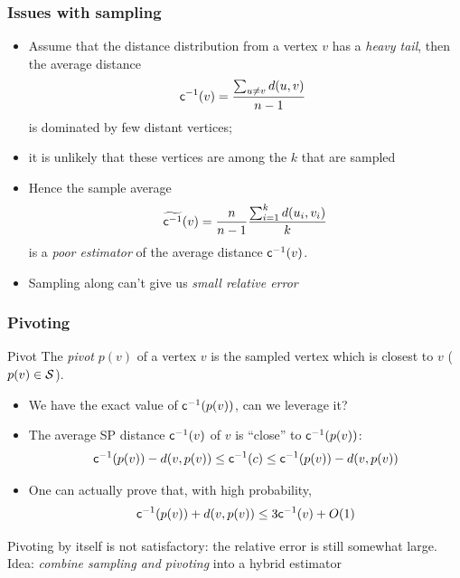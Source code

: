 \begin{frame}
  \frametitle{Issues with sampling}
  \begin{itemize}
    \item Assume that the distance distribution from a vertex $v$ has a
      \emph{heavy tail}, then the average distance
      \[
        \mathsf{c}^{-1}(v)=\frac{\sum_{u\neq v}d(u,v)}{n-1}\enspace
      \]
      is dominated by few distant vertices;
    \pause
    \item it is unlikely that these vertices are among the $k$ that are sampled
    \item Hence the sample average
      \[
        \widetilde{\mathsf{c}^{-1}}(v)=\frac{n}{n-1}\frac{\sum_{i=1}^k
        d(u_i,v_i)}{k}
      \]
      is a \emph{poor estimator} of the average distance $\mathsf{c}^{-1}(v)$.
    \pause
    \item Sampling along can't give us \emph{small relative error}
  \end{itemize}
\end{frame}

\begin{frame}
  \frametitle{Pivoting}
  \begin{definition}{Pivot}
    The \emph{pivot} $p(v)$ of a vertex $v$ is the sampled vertex which is
    closest to $v$ ($p(v)\in{\cal S}$).
  \end{definition}
  \begin{itemize}
    \item We have the exact value of $\mathsf{c}^{-1}(p(v))$, can we leverage
      it?
    \pause
    \item The average SP distance $\mathsf{c}^{-1}(v)$ of $v$ is ``close'' to
      $\mathsf{c}^{-1}(p(v))$:
      \[
        \mathsf{c}^{-1}(p(v))-d(v,p(v)) \le \mathsf{c}^{-1}(c) \le \mathsf{c}^{-1}(p(v))-d(v,p(v))
      \]
    \vspace{-20pt}
    \pause
    \item One can actually prove that, with high probability,
      \[
        \mathsf{c}^{-1}(p(v))+d(v,p(v))\le 3\mathsf{c}^{-1}(v)+O(1)
      \]
      \vspace{-20pt}
  \end{itemize}
  \pause
  Pivoting by itself is not satisfactory: the relative error is still somewhat
  large.
  \vfill
  \pause
  Idea: \emph{combine sampling and pivoting} into a hybrid estimator
\end{frame}

